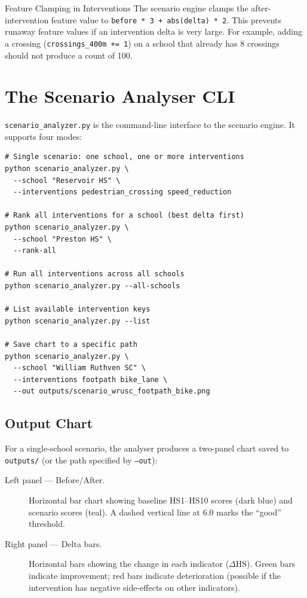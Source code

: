 \documentclass[11pt,a4paper,openany]{book}
\begin{document}
\begin{warnbox}{Feature Clamping in Interventions}
The scenario engine clamps the after-intervention feature value to \texttt{before * 3 + abs(delta) * 2}. This prevents runaway feature values if an intervention delta is very large. For example, adding a crossing (\texttt{crossings\_400m += 1}) on a school that already has 8 crossings should not produce a count of 100.
\end{warnbox}

\section{The Scenario Analyser CLI}

\texttt{scenario\_analyzer.py} is the command-line interface to the scenario engine. It supports four modes:

\begin{lstlisting}[style=bash, caption={scenario\_analyzer.py CLI usage examples.}]
# Single scenario: one school, one or more interventions
python scenario_analyzer.py \
  --school "Reservoir HS" \
  --interventions pedestrian_crossing speed_reduction

# Rank all interventions for a school (best delta first)
python scenario_analyzer.py \
  --school "Preston HS" \
  --rank-all

# Run all interventions across all schools
python scenario_analyzer.py --all-schools

# List available intervention keys
python scenario_analyzer.py --list

# Save chart to a specific path
python scenario_analyzer.py \
  --school "William Ruthven SC" \
  --interventions footpath bike_lane \
  --out outputs/scenario_wrusc_footpath_bike.png
\end{lstlisting}

\subsection{Output Chart}

For a single-school scenario, the analyser produces a two-panel chart saved to \texttt{outputs/} (or the path specified by \texttt{--out}):

\begin{description}
  \item[Left panel --- Before/After.] Horizontal bar chart showing baseline HS1--HS10 scores (dark blue) and scenario scores (teal). A dashed vertical line at 6.0 marks the ``good'' threshold.
  \item[Right panel --- Delta bars.] Horizontal bars showing the change in each indicator ($\Delta\text{HS}$). Green bars indicate improvement; red bars indicate deterioration (possible if the intervention has negative side-effects on other indicators).
\end{description}
\end{document}
